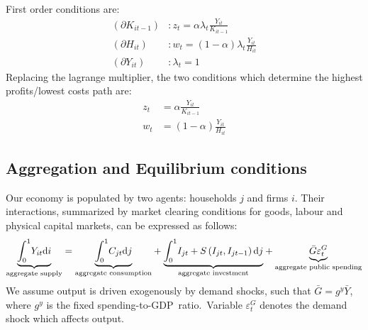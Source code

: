 \documentclass[a4paper,12pt]{article}%
\begin{document}
First order conditions are:\
\begin{align*}
\left(  \partial K_{it-1}\right)   &  :z_{t}=\alpha\lambda_{t}\frac{Y_{it}%
}{K_{it-1}}\\
\left(  \partial H_{it}\right)   &  :w_{t}=\left(  1-\alpha\right)
\lambda_{t}\frac{Y_{it}}{H_{it}}\\
\left(  \partial Y_{it}\right)   &  :\lambda_{t}=1
\end{align*}
Replacing the lagrange multiplier, the two conditions which determine the
highest profits/lowest costs path are:%
\begin{align}
z_{t}  &  =\alpha\frac{Y_{it}}{K_{it-1}}\\
w_{t}  &  =\left(  1-\alpha\right)  \frac{Y_{it}}{H_{it}}%
\end{align}


\subsection{Aggregation and Equilibrium conditions}

Our economy is populated by two agents: households $j$ and firms $i$. Their
interactions, summarized by market clearing conditions for goods, labour and
physical capital markets, can be expressed as follows:%
\[
\underset{\text{aggregate supply}}{\underbrace{%
{\displaystyle\int\nolimits_{0}^{1}}
Y_{it}\text{d}i}}=\underset{\text{aggregate consumption}}{\underbrace{%
{\displaystyle\int\nolimits_{0}^{1}}
C_{jt}\text{d}j}}+\underset{\text{aggregate investment}}{\underbrace{%
{\displaystyle\int\nolimits_{0}^{1}}
I_{jt}+S\left(  I_{jt},I_{jt-1}\right)  \text{d}j}}+\underset{\text{aggregate
public spending}}{\underbrace{\bar{G}\varepsilon_{t}^{G}}}%
\]
We assume output is driven exogenously by demand shocks, such that $\bar
{G}=g^{y}\bar{Y}$, where $g^{y}$ is the fixed
spending-to-GDP\ ratio.\ Variable $\varepsilon_{t}^{G}$ denotes the demand
shock which affects output.
\end{document}
